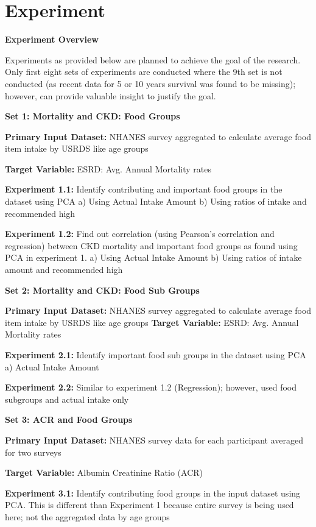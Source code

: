 \section{Experiment}

\noindent \textbf{Experiment Overview} 

\noindent Experiments as provided below are planned to achieve the goal of the research. Only first eight sets of experiments are conducted where the 9th set is  not conducted (as recent data for 5 or 10 years survival was found to be missing); however, can provide valuable insight to justify the goal.

\noindent \textbf{Set 1: Mortality and CKD: Food Groups}

\noindent \textbf{Primary Input Dataset:} NHANES survey aggregated to calculate average food item intake by USRDS like age groups

\noindent \textbf{Target Variable:} ESRD: Avg. Annual Mortality rates

\noindent \textbf{Experiment 1.1:}  Identify contributing and important food groups in the dataset using PCA  a) Using Actual Intake Amount b) Using ratios of intake and recommended high

\noindent \textbf{Experiment 1.2:}  Find out correlation (using Pearson’s correlation and regression) between CKD mortality and important food groups as found using PCA in experiment 1.  a) Using Actual Intake Amount b) Using ratios of intake amount and recommended high


\noindent \textbf{Set 2: Mortality and CKD: Food Sub Groups}

\noindent \textbf{Primary Input Dataset:} NHANES survey aggregated to calculate average food item intake by USRDS like age groups
\noindent \textbf{Target Variable:} ESRD: Avg. Annual Mortality rates

\noindent \textbf{Experiment 2.1:}  Identify important food sub groups in the dataset using PCA a) Actual Intake Amount 

\noindent \textbf{Experiment 2.2:}  Similar to experiment 1.2 (Regression); however, used food subgroups and actual intake only


\noindent \textbf{Set 3: ACR and Food Groups}

\noindent \textbf{Primary Input Dataset:} NHANES survey data for each participant averaged for  two surveys

\noindent \textbf{Target Variable:} Albumin Creatinine Ratio (ACR)

\noindent \textbf{Experiment 3.1:}  Identify contributing food groups in the input dataset using PCA. This is different than Experiment 1 because entire survey is being used here; not the aggregated data by age groups

